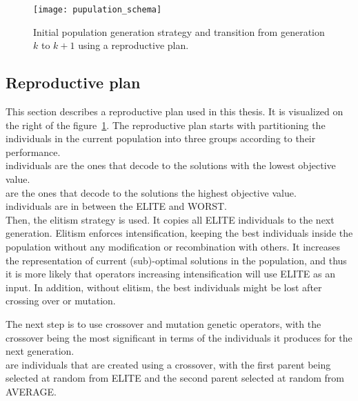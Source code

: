 \begin{figure}[!h]
    \texttt{[image: pupulation\_schema]}
    \caption[Initial population generation strategy and transition]
    {Initial population generation strategy and transition from generation $k$ to $k+1$ using a reproductive plan.}
    \label{fig:population-schema}
\end{figure}


\newpage

\subsection{Reproductive plan}\label{subsec:reproductive-plan}
This section describes a reproductive plan used in this thesis.
It is visualized on the right of the figure~\ref{fig:population-schema}.
The reproductive plan starts with partitioning the individuals in the current
population into three groups according to their performance.\\

 individuals are the ones that decode to the solutions with the lowest objective value.\\

 are the ones that decode to the solutions the highest objective value.\\

 individuals are in between the ELITE and WORST.\\

Then, the elitism strategy is used.
It copies all ELITE individuals to the next generation.
Elitism enforces intensification, keeping the best individuals inside the population without any
modification or recombination with others.
It increases the representation of current \mbox{(sub)-optimal} solutions in the population, and thus it is
more likely that operators increasing intensification will use ELITE as an input.
In addition, without elitism, the best individuals might be lost after crossing over or mutation.

The next step is to use crossover and mutation genetic operators, with the crossover being
the most significant in terms of the individuals it produces for the next generation.\\

 are individuals that are created using a crossover, with the first parent being selected
at random from ELITE and the second parent selected at random from AVERAGE.\\

